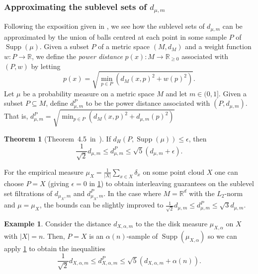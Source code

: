 \documentclass[10pt,a4paper]{article}
\theoremstyle{definition}
\newtheorem{thm}{Theorem}[section]
\newtheorem{ex}{Example}[thm]
\newcommand{\R}{\mathbb{R}}
\begin{document}
	\subsubsection{Approximating the sublevel sets of $d_{\mu,m}$}
 	Following the exposition given in \autocite{Buchet2013}, we see how the sublevel sets of $d_{\mu,m}$ can be approximated by the union of balls centred at each point in some sample $P$ of $\operatorname{Supp}(\mu)$. Given a subset $P$ of a metric space $(M, d_M)$ and a weight function $w\colon P\to\R$, we define the \textit{power distance} $p(x)\colon M\to\R_{\geq0}$ associated with $(P,w)$ by letting
 	$$
 	p(x)=\sqrt{\min_{p\in P}\left(d_M(x,p)^2+w(p)^2\right)}.
 	$$
 	Let $\mu$ be a probability measure on a metric space $M$ and let $m\in(0,1]$. Given a subset $P\subseteq M$, define $d_{\mu,m}^P$ to be the power distance associated with $(P,d_{\mu,m})$. That is, $d_{\mu,m}^P=\sqrt{\min_{p\in P}\left(d_M(x,p)^2+d_{\mu,m}(p)^2\right)}$
 	\begin{thm}[Theorem~4.5~in~\autocite{Buchet2013}]
 		\label{thm_power_distance_dtm_inequality}
 		If $d_H(P,\operatorname{Supp}(\mu))\leq\epsilon$, then $$\frac{1}{\sqrt{2}}d_{\mu,m}\leq d_{\mu,m}^P \leq \sqrt{5}(d_{\mu,m}+\epsilon).$$
 	\end{thm}
 	For the empirical measure $\mu_X = \frac{1}{|X|}\sum_{x\in X}\delta_x$ on some point cloud $X$ one can choose $P=X$ (giving $\epsilon=0$ in \cref{thm_power_distance_dtm_inequality}) to obtain interleaving guarantees on the sublevel set filtrations of $d_{\mu_X,m}$ and $d_{\mu_X,m}^P$. In the case where $M=\R^d$ with the $L_2$-norm and $\mu=\mu_X$, the bounds can be slightly improved to $\frac{1}{\sqrt{2}}d_{\mu,m}\leq d_{\mu,m}^P \leq \sqrt{3}d_{\mu,m}$.

	\begin{ex}
		Consider the distance $d_{X,\alpha, m}$ to the the disk measure $\mu_{X,\alpha}$ on $X$ with $|X|=n$. Then, $P=X$ is an $\alpha(n)$-sample of $\operatorname{Supp}(\mu_{X,\alpha})$ so we can apply \cref{thm_power_distance_dtm_inequality} to obtain the inequalities
		$$
		\frac{1}{\sqrt{2}}d_{X,\alpha, m}\leq d_{X,\alpha, m}^P \leq \sqrt{5}(d_{X,\alpha, m}+\alpha(n)).
		$$
	\end{ex}


	\printbibliography
	
\end{document}
